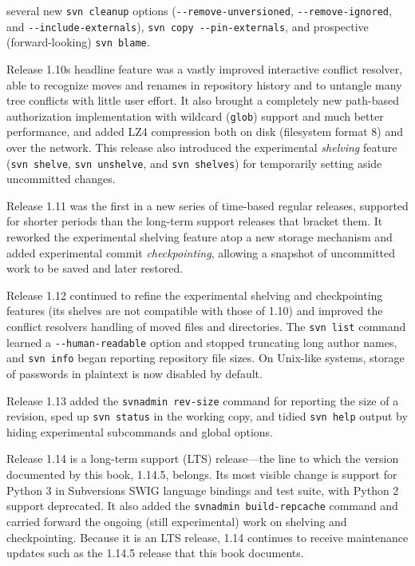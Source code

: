 \begin{description}
several new \texttt{svn\ cleanup} options
(\texttt{-\/-remove-unversioned}, \texttt{-\/-remove-ignored}, and
\texttt{-\/-include-externals}), \texttt{svn\ copy\ -\/-pin-externals},
and prospective (forward-looking) \texttt{svn\ blame}.
\item[Subversion 1.10 (April 2018)]
Release 1.10\textquotesingle s headline feature was a vastly improved
interactive conflict resolver, able to recognize moves and renames in
repository history and to untangle many tree conflicts with little user
effort. It also brought a completely new path-based authorization
implementation with wildcard (\texttt{glob}) support and much better
performance, and added LZ4 compression both on disk (filesystem format
8) and over the network. This release also introduced the experimental
\emph{shelving} feature (\texttt{svn\ shelve}, \texttt{svn\ unshelve},
and \texttt{svn\ shelves}) for temporarily setting aside uncommitted
changes.
\item[Subversion 1.11 (October 2018)]
Release 1.11 was the first in a new series of time-based regular
releases, supported for shorter periods than the long-term support
releases that bracket them. It reworked the experimental shelving feature
atop a new storage mechanism and added experimental commit
\emph{checkpointing}, allowing a snapshot of uncommitted work to be saved
and later restored.
\item[Subversion 1.12 (April 2019)]
Release 1.12 continued to refine the experimental shelving and
checkpointing features (its shelves are not compatible with those of
1.10) and improved the conflict resolver\textquotesingle s handling of
moved files and directories. The \texttt{svn\ list} command learned a
\texttt{-\/-human-readable} option and stopped truncating long author
names, and \texttt{svn\ info} began reporting repository file sizes. On
Unix-like systems, storage of passwords in plaintext is now disabled by
default.
\item[Subversion 1.13 (October 2019)]
Release 1.13 added the \texttt{svnadmin\ rev-size} command for reporting
the size of a revision, sped up \texttt{svn\ status} in the working
copy, and tidied \texttt{svn\ help} output by hiding experimental
subcommands and global options.
\item[Subversion 1.14 (May 2020)]
Release 1.14 is a long-term support (LTS) release---the line to which the
version documented by this book, 1.14.5, belongs. Its most visible change
is support for Python 3 in Subversion\textquotesingle s SWIG language
bindings and test suite, with Python 2 support deprecated. It also added
the \texttt{svnadmin\ build-repcache} command and carried forward the
ongoing (still experimental) work on shelving and checkpointing. Because
it is an LTS release, 1.14 continues to receive maintenance updates such
as the 1.14.5 release that this book documents.
\end{description}


